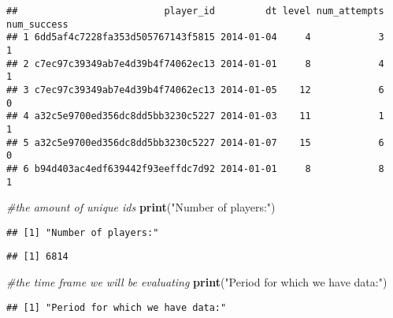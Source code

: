 \documentclass[
]{article}
\newenvironment{Shaded}{\begin{snugshade}}{\end{snugshade}}
\newcommand{\CommentTok}[1]{\textcolor[rgb]{0.56,0.35,0.01}{\textit{#1}}}
\newcommand{\KeywordTok}[1]{\textcolor[rgb]{0.13,0.29,0.53}{\textbf{#1}}}
\newcommand{\NormalTok}[1]{#1}
\newcommand{\OperatorTok}[1]{\textcolor[rgb]{0.81,0.36,0.00}{\textbf{#1}}}
\newcommand{\StringTok}[1]{\textcolor[rgb]{0.31,0.60,0.02}{#1}}
\begin{document}
\begin{verbatim}
##                          player_id         dt level num_attempts num_success
## 1 6dd5af4c7228fa353d505767143f5815 2014-01-04     4            3           1
## 2 c7ec97c39349ab7e4d39b4f74062ec13 2014-01-01     8            4           1
## 3 c7ec97c39349ab7e4d39b4f74062ec13 2014-01-05    12            6           0
## 4 a32c5e9700ed356dc8dd5bb3230c5227 2014-01-03    11            1           1
## 5 a32c5e9700ed356dc8dd5bb3230c5227 2014-01-07    15            6           0
## 6 b94d403ac4edf639442f93eeffdc7d92 2014-01-01     8            8           1
\end{verbatim}

\begin{Shaded}
\begin{Highlighting}[]
\CommentTok{#the amount of unique ids}
\KeywordTok{print}\NormalTok{(}\StringTok{"Number of players:"}\NormalTok{)}
\end{Highlighting}
\end{Shaded}

\begin{verbatim}
## [1] "Number of players:"
\end{verbatim}

\begin{Shaded}
\end{Shaded}

\begin{verbatim}
## [1] 6814
\end{verbatim}

\begin{Shaded}
\begin{Highlighting}[]
\CommentTok{#the time frame we will be evaluating}
\KeywordTok{print}\NormalTok{(}\StringTok{"Period for which we have data:"}\NormalTok{)}
\end{Highlighting}
\end{Shaded}

\begin{verbatim}
## [1] "Period for which we have data:"
\end{verbatim}

\begin{Shaded}
\end{Shaded}
\end{document}
